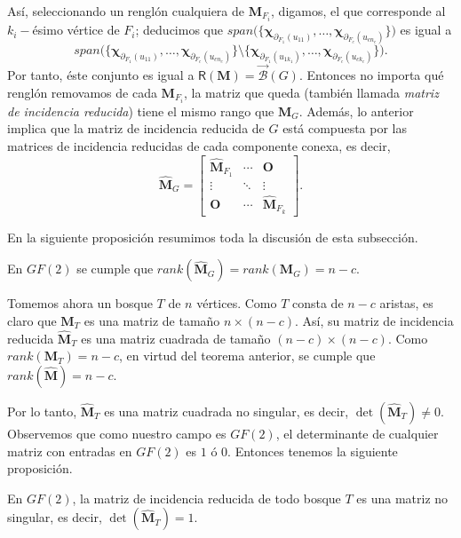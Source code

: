 Así, seleccionando un renglón cualquiera de $\mathbf{M}_{F_{i}}$, digamos, el que corresponde al $k_{i}-$ésimo vértice de $F_{i}$; deducimos que $span\Big(\{\boldsymbol{\chi}_{\partial_{F_{1}}(u_{11})}, \ldots,  \boldsymbol{\chi}_{\partial_{F_{c}}(u_{cn_{c}})} \}\Big)$ es igual a 
$$ 
     span\Big (\{\boldsymbol{\chi}_{\partial_{F_{1}}(u_{11})}, \ldots,  \boldsymbol{\chi}_{\partial_{F_{c}}(u_{cn_{c}})}\} \setminus \{\boldsymbol{\chi}_{\partial_{F_{1}}(u_{1k_{1}})}, \ldots, \boldsymbol{\chi}_{\partial_{F_{c}}(u_{ck_{c}})} \}\Big ).
$$
Por tanto, éste conjunto es igual a $\mathsf{R}(\mathbf{M}) = \overrightarrow{\mathcal{B}}(G).$ Entonces no importa qué renglón removamos de cada $\mathbf{M}_{F_{i}}$, la matriz que queda (también llamada \textit{matriz de incidencia reducida}) tiene el mismo rango que $\mathbf{M}_{G}$. Además, lo anterior implica que la matriz de incidencia reducida de $G$ está compuesta por las matrices de incidencia reducidas de cada componente conexa, es decir, 
$$
\widehat{\mathbf{M}}_{G} = \begin{bmatrix}
\widehat{\mathbf{M}}_{F_{1}} & \cdots & \mathbf{O} \\ 
\vdots & \ddots & \vdots \\ 
\mathbf{O} & \cdots &  \widehat{\mathbf{M}}_{F_{k}}
\end{bmatrix}.
$$

 En la siguiente proposición resumimos toda la discusión de esta subsección.

\begin{prop} \label{prop:rango}
En $GF(2)$ se cumple que $rank(\widehat{\mathbf{M}}_{G}) = rank(\mathbf{M}_{G})= n-c$.
\end{prop}

Tomemos ahora un bosque $T$ de $n$ vértices. Como $T$ consta de $n-c$ aristas, es claro que $\mathbf{M}_{T}$ es una matriz de tamaño $n \times (n-c)$. Así, su matriz de incidencia reducida $\widehat{\mathbf{M}}_{T}$ es una matriz cuadrada de tamaño $(n-c) \times (n-c)$. Como $rank(\mathbf{M}_{T}) = n-c$, en virtud del teorema anterior, se cumple que $rank(\widehat{\mathbf{M}}) = n-c$. 

Por lo tanto, $\widehat{\mathbf{M}}_{T}$ es una matriz cuadrada no singular, es decir, $\det(\widehat{\mathbf{M}}_{T}) \neq 0$. Observemos que como nuestro campo es $GF(2)$, el determinante de cualquier matriz con entradas en $GF(2)$ es $1$ ó $0$. Entonces tenemos la siguiente proposición.

\begin{prop} \label{prop:arbolesnosingulares}
En $GF(2)$, la matriz de incidencia reducida de todo bosque $T$ es una matriz no singular, es decir, $\det(\widehat{\mathbf{M}}_{T}) = 1$.
\end{prop}


